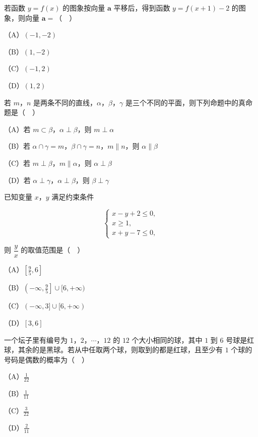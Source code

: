 \begin{question}
若函数 $y=f(x)$ 的图象按向量 $\boldsymbol a$ 平移后，得到函数 $y=f(x+1)-2$ 的图象，则向量 $\boldsymbol a=$（　）

（A）$(-1,-2)$

（B）$(1,-2)$

（C）$(-1,2)$

（D）$(1,2)$

\end{question}
\begin{question}
若 $m$，$n$ 是两条不同的直线，$\alpha$，$\beta$，$\gamma$ 是三个不同的平面，则下列命题中的真命题是（　）

（A）若 $m\subset\beta$，$\alpha\perp\beta$，则 $m\perp\alpha$

（B）若 $\alpha\cap\gamma=m$，$\beta\cap\gamma=n$，$m\parallel n$，则 $\alpha\parallel\beta$

（C）若 $m\perp\beta$，$m\parallel\alpha$，则 $\alpha\perp\beta$

（D）若 $\alpha\perp\gamma$，$\alpha\perp\beta$，则 $\beta\perp\gamma$

\end{question}
\begin{question}
已知变量 $x$，$y$ 满足约束条件

\nopagebreak[4]
\[\begin{cases}x-y+2\leqslant0,\\ x\geqslant1,\\ x+y-7\leqslant0,\end{cases}\]

则 $\dfrac yx$ 的取值范围是（　）

（A）$\left[\frac95,6\right]$

（B）$\left(-\infty,\frac95\right]\cup[6,+\infty)$

（C）$(-\infty,3]\cup[6,+\infty)$

（D）$[3,6]$

\end{question}
\begin{question}
一个坛子里有编号为 $1$，$2$，$\cdots$，$12$ 的 $12$ 个大小相同的球，其中 $1$ 到 $6$ 号球是红球，其余的是黑球。若从中任取两个球，则取到的都是红球，且至少有 $1$ 个球的号码是偶数的概率为（　）

（A）$\frac1{22}$

（B）$\frac1{11}$

（C）$\frac3{22}$

（D）$\frac2{11}$

\end{question}
